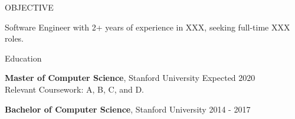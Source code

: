 \documentclass{resume} %
\begin{document}





\begin{rSection}{OBJECTIVE}



{Software Engineer with 2+ years of experience in XXX, seeking full-time XXX roles.}





\end{rSection}






\begin{rSection}{Education}



{\bf Master of Computer Science}, Stanford University \hfill {Expected 2020}\\

Relevant Coursework: A, B, C, and D.



{\bf Bachelor of Computer Science}, Stanford University \hfill {2014 - 2017}








\end{rSection}





\end{document}
